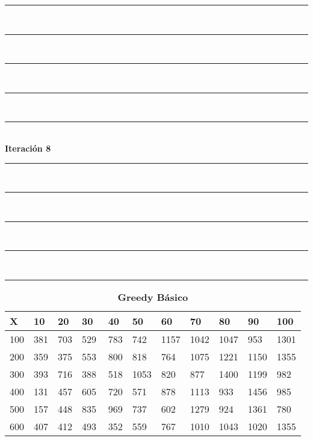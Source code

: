 \documentclass[10pt,letterpaper]{article}
\begin{document}
\newpage 
\begin{center}
\newcommand{\HRule}{\rule{\linewidth}{0.5mm}}
\center
\HRule\\[6cm]
\HRule\\[0.4cm]
\HRule\\[0.4cm]
\HRule\\[0.4cm]
\HRule\\[0.4cm]
{\centering \Huge\bfseries Iteración 8}\\[0.4cm]
\HRule\\[0.4cm]
\HRule\\[0.4cm]
\HRule\\[0.4cm]
\HRule\\[6cm]
\HRule
\end{center}
\newpage 
{}
\begin{center}
\begin{table}\renewcommand{\arraystretch}{2.5}
\caption{\large \textbf{Greedy Básico}}
\centering
\begin{tabular} { |m{0.5cm}|m{1.3cm}|m{1.3cm}|m{1.3cm}|m{1.3cm}|m{1.3cm}|m{1.3cm}|m{1.3cm}|m{1.3cm}|m{1.3cm}|m{1.3cm}|} 
\hline
\rowcolor{Gray}
\centering \textbf{X} & \centering \textbf{10} & \centering \textbf{20} & \centering \textbf{30}\ & \centering \textbf{40} & \centering \textbf{50} & \centering \textbf{60}\ & \centering \textbf{70} & \centering \textbf{80} & \centering \textbf{90}\ & \textbf{100} \\\hline
\cellcolor{Gray}100 & \Large 381 & \Large 703 & \Large 529 & \Large 783 & \Large 742 & \Large 1157 & \Large 1042 & \Large 1047 & \Large 953 & \Large 1301 \\
\hline
\cellcolor{Gray}200 & \Large 359 & \Large 375 & \Large 553 & \Large 800 & \Large 818 & \Large 764 & \Large 1075 & \Large 1221 & \Large 1150 & \Large 1355 \\
\hline
\cellcolor{Gray}300 & \Large 393 & \Large 716 & \Large 388 & \Large 518 & \Large 1053 & \Large 820 & \Large 877 & \Large 1400 & \Large 1199 & \Large 982 \\
\hline
\cellcolor{Gray}400 & \Large 131 & \Large 457 & \Large 605 & \Large 720 & \Large 571 & \Large 878 & \Large 1113 & \Large 933 & \Large 1456 & \Large 985 \\
\hline
\cellcolor{Gray}500 & \Large 157 & \Large 448 & \Large 835 & \Large 969 & \Large 737 & \Large 602 & \Large 1279 & \Large 924 & \Large 1361 & \Large 780 \\
\hline
\cellcolor{Gray}600 & \Large 407 & \Large 412 & \Large 493 & \Large 352 & \Large 559 & \Large 767 & \Large 1010 & \Large 1043 & \Large 1020 & \Large 1355 \\

\end{tabular}
\end{table}
\end{center}
\end{document}
